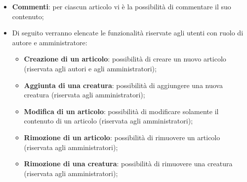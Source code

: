 \begin{itemize}
\begin{itemize}
        \item \textbf{Commenti}: per ciascun articolo vi è la possibilità di commentare il suo contenuto;
        \item Di seguito verranno elencate le funzionalità riservate agli utenti con ruolo di autore e amministratore:
        \begin{itemize}
            \item \textbf{Creazione di un articolo}: possibilità di creare un nuovo articolo (riservata agli autori e agli amministratori);
            \item \textbf{Aggiunta di una creatura}: possibilità di aggiungere una nuova creatura (riservata agli amministratori);
            \item \textbf{Modifica di un articolo}: possibilità di modificare solamente il contenuto di un articolo (riservata agli amministratori);
            \item \textbf{Rimozione di un articolo}: possibilità di rimuovere un articolo (riservata agli amministratori);
            \item \textbf{Rimozione di una creatura}: possibilità di rimuovere una creatura (riservata agli amministratori);
        \end{itemize}
    \end{itemize}
\end{itemize}